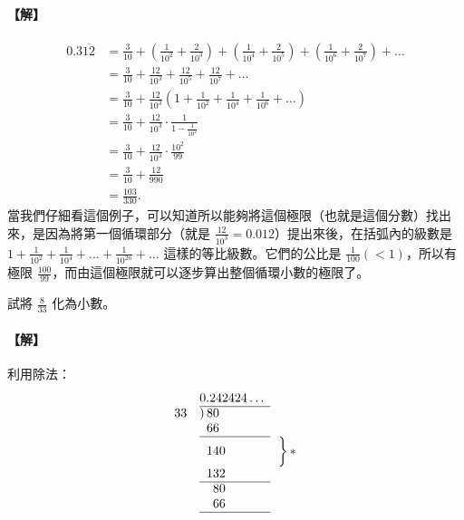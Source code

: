 \paragraph{【解】} 
\begin{align*}
0.3\overline{12} &= \frac{3}{10}+\left(\frac{1}{10^2}+\frac{2}{10^3}\right)+\left(\frac{1}{10^4}+\frac{2}{10^5}\right)+\left(\frac{1}{10^6}+\frac{2}{10^7}\right)+\dots \\
&= \frac{3}{10}+\frac{12}{10^3}+\frac{12}{10^5}+\frac{12}{10^7}+\dots \\
&= \frac{3}{10}+\frac{12}{10^3}\left(1+\frac{1}{10^2}+\frac{1}{10^4}+\frac{1}{10^6}+\dots\right) \\
&= \frac{3}{10}+\frac{12}{10^3}\cdot\frac{1}{1-\frac{1}{10^2}} \\
&= \frac{3}{10}+\frac{12}{10^3}\cdot\frac{10^2}{99} \\
&= \frac{3}{10}+\frac{12}{990} \\
&= \frac{103}{330}.
\end{align*}
當我們仔細看這個例子，可以知道所以能夠將這個極限（也就是這個分數）找出來，是因為將第一個循環部分（就是 $\frac{12}{10^3}=0.012$）提出來後，在括弧內的級數是 $1+\frac{1}{10^2}+\frac{1}{10^4}+\dots+\frac{1}{10^{2n}}+\dots$ 這樣的等比級數。它們的公比是 $\frac{1}{100}(<1)$，所以有極限 $\frac{100}{99}$，而由這個極限就可以逐步算出整個循環小數的極限了。

\begin{example}\label{ex:b2_2-6-3}
試將 $\frac{8}{33}$ 化為小數。
\end{example}
\paragraph{【解】} 利用除法：
\[
\begin{array}{r@{\quad}ll}
    & 0.242424\dots & \\
    \cline{2-2}
    33 & )\, 80 & \\
    & \phantom{)\, } 66 & \\
    \cline{2-2}
    & \phantom{)\, } 140 & \left.\vphantom{\begin{array}{c}1\\1\end{array}}\right\} * \\
    & \phantom{)\, } 132 & \\
    \cline{2-2}
    & \phantom{)\, 0} 80 & \\
    & \phantom{)\, 0} 66 & \\
    \cline{2-2}
\end{array}
\]

